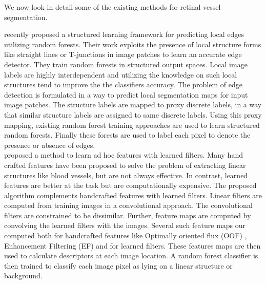 We now look in detail some of the existing methods for retinal vessel segmentation.

\citet{dollar2013structured} recently proposed a structured learning framework for predicting local edges utilizing random forests. Their work exploits the presence of local structure forms like straight lines or T-junctions in image patches to learn an accurate edge detector. They train random forests in structured output spaces. Local image labels are highly interdependent and utilizing the knowledge on such local structures tend to improve the the classifiers accuracy. The problem of edge detection is formulated in a way to predict local segmentation maps for input image patches.  The structure labels are mapped to proxy discrete labels, in a way that similar structure labels are assigned to same discrete labels. Using this proxy mapping, existing random forest training approaches are used to learn structured random forests. Finally these forests are used to label each pixel to denote the presence or absence of edges.\\


\citet{rigamonti2012accurate} proposed a method to learn ad hoc features with learned filters. Many hand crafted features have been proposed to solve the problem of extracting linear structures like blood vessels, but are not always effective. In contrast, learned features are better at the task but are computationally expensive. The proposed algorithm complements handcrafted features with learned filters. Linear filters are computed from training images in a convolutional approach. The convolutional filters are constrained to be dissimilar. Further, feature maps are computed by convolving the learned filters with the images. Several such feature maps our computed both for handcrafted features like Optimally oriented flux (OOF) \cite{law2008three}, Enhancement Filtering (EF) \cite{frangi1998multiscale} and for learned filters. These features maps are then used to calculate descriptors at each image location. A random forest classifier is then trained to classify each image pixel as lying on a linear structure or background.\\

